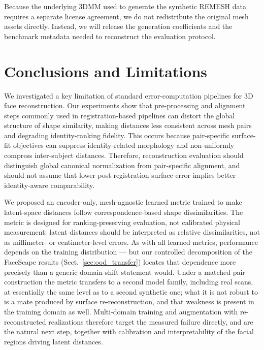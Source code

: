 \documentclass{article}
\begin{document}
Because the underlying 3DMM used to generate the synthetic REMESH data
requires a separate license agreement, we do not redistribute the original mesh
assets directly. Instead, we will release the generation coefficients and the
benchmark metadata needed to reconstruct the evaluation protocol. 

\section{Conclusions and Limitations}\label{sec:limitations}
We investigated a key limitation of standard error-computation pipelines for
3D face reconstruction. Our experiments show that pre-processing and alignment
steps commonly used in registration-based pipelines can distort the global
structure of shape similarity, making distances less consistent across mesh
pairs and degrading identity-ranking fidelity. This occurs because pair-specific
surface-fit objectives can suppress identity-related morphology and non-uniformly
compress inter-subject distances. Therefore, reconstruction evaluation should
distinguish global canonical normalization from pair-specific alignment, and
should not assume that lower post-registration surface error implies better
identity-aware comparability.

We proposed an encoder-only, mesh-agnostic learned metric trained to make
latent-space distances follow correspondence-based shape dissimilarities. The
metric is designed for ranking-preserving evaluation, not calibrated physical
measurement: latent distances should be interpreted as relative dissimilarities,
not as millimeter- or centimeter-level errors. As with all learned metrics,
performance depends on the training distribution --- but our controlled decomposition of
the FaceScape results (Sect.~\ref{sec:ood_transfer}) locates that dependence more
precisely than a generic domain-shift statement would. Under a matched pair construction
the metric transfers to a second model family, including real scans, at essentially the
same level as to a second synthetic one; what it is not robust to is a mate produced by
surface re-reconstruction, and that weakness is present in the training domain as well.
Multi-domain training and augmentation with re-reconstructed realizations therefore target
the measured failure directly, and are the natural next step, together with calibration
and interpretability of the facial regions driving latent distances.
\end{document}
